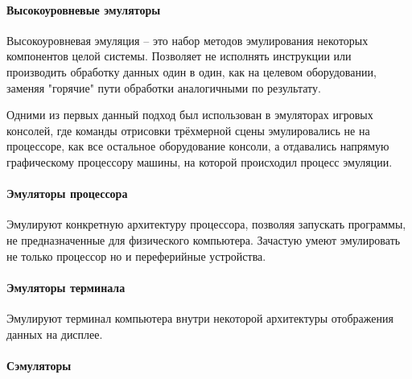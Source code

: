 \paragraph{Высокоуровневые эмуляторы}\label{high-level-emu}

Высокоуровневая эмуляция -- это набор методов эмулирования некоторых компонентов целой системы.
Позволяет не исполнять инструкции или производить обработку данных один в один, как на целевом оборудовании,
заменяя "горячие" пути обработки аналогичными по результату.

Одними из первых данный подход был использован в эмуляторах игровых консолей, где команды отрисовки трёхмерной сцены
эмулировались не на процессоре, как все остальное оборудование консоли, а отдавались напрямую
графическому процессору машины, на которой происходил процесс эмуляции.


\paragraph{Эмуляторы процессора}\label{cpu-emu}

Эмулируют конкретную архитектуру процессора, позволяя запускать программы, не предназначенные для физического компьютера.
Зачастую умеют эмулировать не только процессор но и переферийные устройства.


\paragraph{Эмуляторы терминала}\label{term-emu}

Эмулируют терминал компьютера внутри некоторой архитектуры отображения данных на дисплее.


\paragraph{Сэмуляторы}\label{sim-emu}

